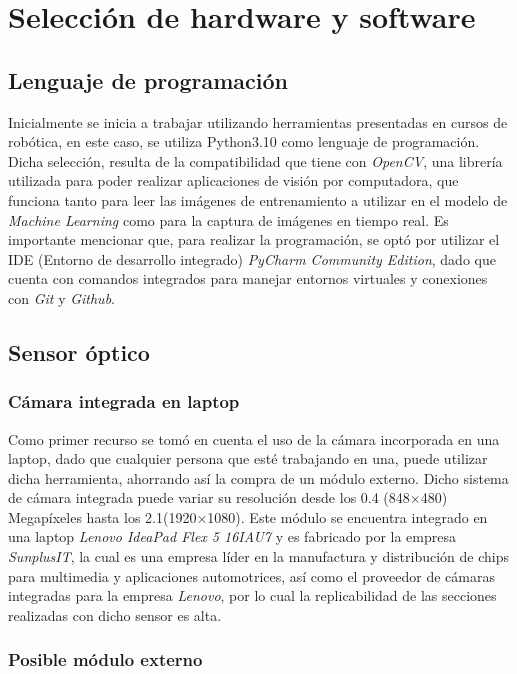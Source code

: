\chapter{Selección de hardware y software}

\section{Lenguaje de programación}
Inicialmente se inicia a trabajar utilizando herramientas presentadas en cursos de robótica, en este caso, se utiliza Python3.10 como lenguaje de programación. Dicha selección, resulta de la compatibilidad que tiene con \textit{OpenCV}, una librería utilizada para poder realizar aplicaciones de visión por computadora, que funciona tanto para leer las imágenes de entrenamiento a utilizar en el modelo de \textit{Machine Learning} como para la captura de imágenes en tiempo real. Es importante mencionar que, para realizar la programación, se optó por utilizar el IDE (Entorno de desarrollo integrado) \textit{PyCharm Community Edition}, dado que cuenta con comandos integrados para manejar entornos virtuales y conexiones con \textit{Git} y \textit{Github}.


\section{Sensor óptico}
\subsection{Cámara integrada en laptop}
Como primer recurso se tomó en cuenta el uso de la cámara incorporada en una laptop, dado que cualquier persona que esté trabajando en una, puede utilizar dicha herramienta, ahorrando así la compra de un módulo externo. Dicho sistema de cámara integrada puede variar su resolución desde los 0.4 (848$\times$480) Megapíxeles hasta los 2.1(1920$\times$1080). Este módulo se encuentra integrado en una laptop \textit{Lenovo IdeaPad Flex 5 16IAU7} y es fabricado por la empresa \textit{SunplusIT}, la cual es una empresa líder en la manufactura y distribución de chips para multimedia y aplicaciones automotrices, así como el proveedor de cámaras integradas para la empresa \textit{Lenovo}, por lo cual la replicabilidad de las secciones realizadas con dicho sensor es alta.

\subsection{Posible módulo externo}

